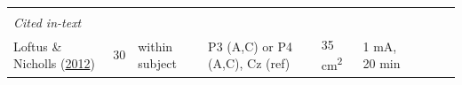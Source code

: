 \documentclass[11pt,]{memoir}
\begin{document}
\begin{longtable}[]{@{}lllllllll@{}}
\begin{minipage}[t]{0.24\columnwidth}
\strut
\end{minipage}\tabularnewline
\begin{minipage}[t]{0.09\columnwidth}\raggedright
\emph{Cited in-text}\strut
\end{minipage} & \begin{minipage}[t]{0.02\columnwidth}\raggedright
\strut
\end{minipage} & \begin{minipage}[t]{0.04\columnwidth}\raggedright
\strut
\end{minipage} & \begin{minipage}[t]{0.10\columnwidth}\raggedright
\strut
\end{minipage} & \begin{minipage}[t]{0.03\columnwidth}\raggedright
\strut
\end{minipage} & \begin{minipage}[t]{0.05\columnwidth}\raggedright
\strut
\end{minipage} & \begin{minipage}[t]{0.04\columnwidth}\raggedright
\strut
\end{minipage} & \begin{minipage}[t]{0.15\columnwidth}\raggedright
\strut
\end{minipage} & \begin{minipage}[t]{0.24\columnwidth}\raggedright
\strut
\end{minipage}\tabularnewline
\begin{minipage}[t]{0.09\columnwidth}\raggedright
Loftus \& Nicholls (\protect\hyperlink{ref-Loftus2012}{2012})\strut
\end{minipage} & \begin{minipage}[t]{0.02\columnwidth}\raggedright
30\strut
\end{minipage} & \begin{minipage}[t]{0.04\columnwidth}\raggedright
within
subject\strut
\end{minipage} & \begin{minipage}[t]{0.10\columnwidth}\raggedright
P3 (A,C) or P4 (A,C), Cz
(ref)\strut
\end{minipage} & \begin{minipage}[t]{0.03\columnwidth}\raggedright
35
cm\textsuperscript{2}\strut
\end{minipage} & \begin{minipage}[t]{0.05\columnwidth}\raggedright
1 mA, 20
min\strut
\end{minipage} & \begin{minipage}[t]{0.04\columnwidth}\raggedright

\end{minipage}
\end{longtable}
\end{document}
